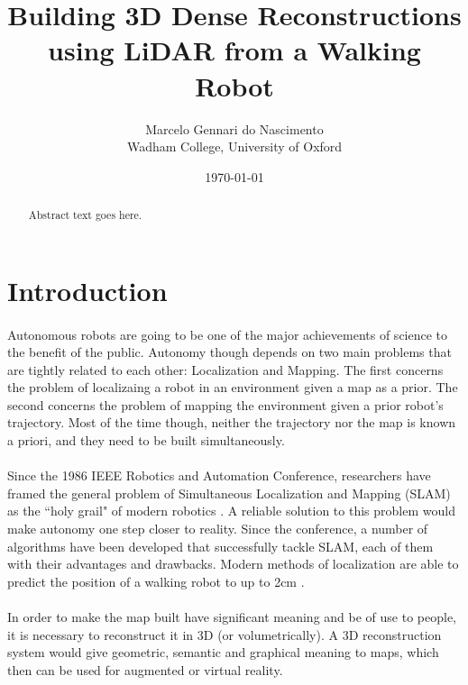 \documentclass[11pt]{article}
\title{Building 3D Dense Reconstructions using LiDAR from a Walking Robot}
\author{Marcelo Gennari do Nascimento \\ Wadham College, University of Oxford}
\date{\today}
\begin{document}

	\maketitle

	\newpage

	\begin{abstract}
		Abstract text goes here.
	\end{abstract}

	\newpage
	\tableofcontents

	\newpage
	\section{Introduction}
	\paragraph{}
	Autonomous robots are going to be one of the major achievements of science to the benefit of the public. Autonomy though depends on two main problems that are tightly related to each other: Localization and Mapping. The first concerns the problem of localizaing a robot in an environment given a map as a prior. The second concerns the problem of mapping the environment given a prior robot's trajectory. Most of the time though, neither the trajectory nor the map is known a priori, and they need to be built simultaneously.
	
	\paragraph{}
	Since the 1986 IEEE Robotics and Automation Conference, researchers have framed the general problem of Simultaneous Localization and Mapping (SLAM) as the ``holy grail" of modern robotics \cite{SLAMPartI}. A reliable solution to this problem would make autonomy one step closer to reality. Since the conference, a number of algorithms have been developed that successfully tackle SLAM, each of them with their advantages and drawbacks. Modern methods of localization are able to predict the position of a walking robot to up to 2cm \cite{7041346}.
	
	\paragraph{}
	In order to make the map built have significant meaning and be of use to people, it is necessary to reconstruct it in 3D (or volumetrically). A 3D reconstruction system would give geometric, semantic and graphical meaning to maps, which then can be used for augmented or virtual reality.
	
\end{document}
